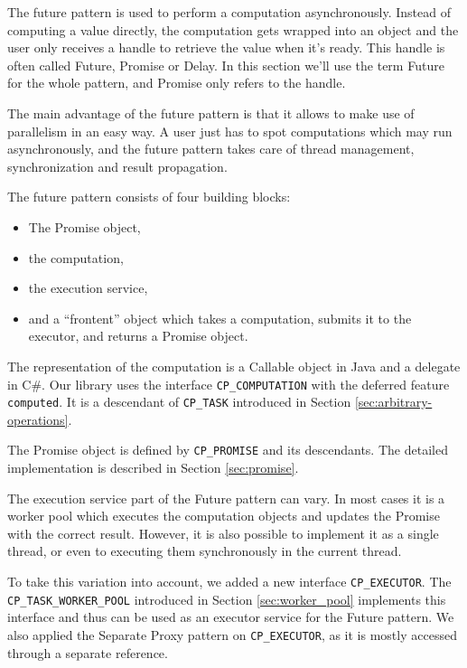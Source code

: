 The future pattern is used to perform a computation asynchronously.
Instead of computing a value directly, the computation gets wrapped into an object and the user only receives a handle to retrieve the value when it's ready.
This handle is often called Future, Promise or Delay.
In this section we'll use the term Future for the whole pattern, and Promise only refers to the handle.

The main advantage of the future pattern is that it allows to make use of parallelism in an easy way.
A user just has to spot computations which may run asynchronously, and the future pattern takes care of thread management, synchronization and result propagation.

The future pattern consists of four building blocks:
\begin{itemize}
 \item The Promise object,
 \item the computation,
 \item the execution service,
 \item and a ``frontent'' object which takes a computation, submits it to the executor, and returns a Promise object.
\end{itemize}

The representation of the computation is a Callable object in Java and a delegate in C\#.
Our library uses the interface \lstinline!CP_COMPUTATION! with the deferred feature \lstinline!computed!.
It is a descendant of \lstinline!CP_TASK! introduced in Section \ref{sec:arbitrary-operations}.

The Promise object is defined by \lstinline!CP_PROMISE! and its descendants.
The detailed implementation is described in Section \ref{sec:promise}.

The execution service part of the Future pattern can vary.
In most cases it is a worker pool which executes the computation objects and updates the Promise with the correct result.
However, it is also possible to implement it as a single thread, or even to executing them synchronously in the current thread.

To take this variation into account, we added a new interface \lstinline!CP_EXECUTOR!.
The \lstinline!CP_TASK_WORKER_POOL! introduced in Section \ref{sec:worker_pool} implements this interface and thus can be used as an executor service for the Future pattern.
We also applied the Separate Proxy pattern on \lstinline!CP_EXECUTOR!, as it is mostly accessed through a separate reference.


